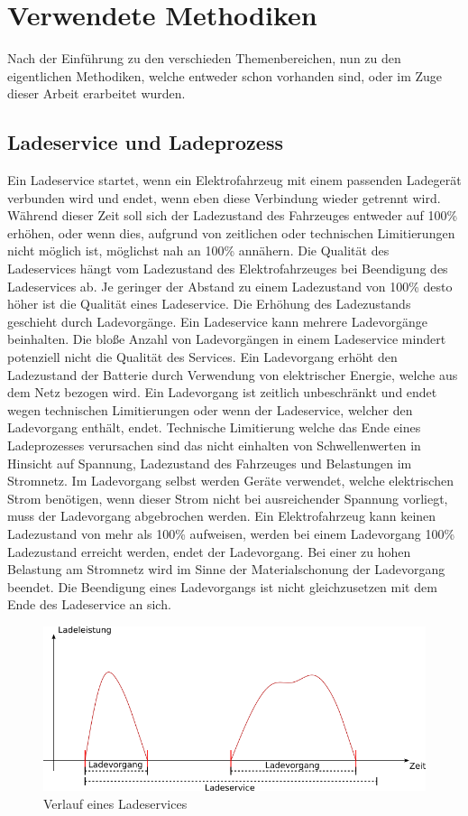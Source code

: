\chapter{Verwendete Methodiken}
Nach der Einführung zu den verschieden Themenbereichen, nun zu den eigentlichen Methodiken, welche entweder schon vorhanden sind, oder im Zuge dieser Arbeit erarbeitet wurden.
\section{Ladeservice und Ladeprozess}
Ein Ladeservice startet, wenn ein Elektrofahrzeug mit einem passenden Ladegerät verbunden wird und endet, wenn eben diese Verbindung wieder getrennt wird. Während dieser Zeit soll sich der Ladezustand des Fahrzeuges entweder auf 100\% erhöhen, oder wenn dies, aufgrund von zeitlichen oder technischen Limitierungen nicht möglich ist, möglichst nah an 100\% annähern. Die Qualität des Ladeservices hängt vom Ladezustand des Elektrofahrzeuges bei Beendigung des Ladeservices ab. Je geringer der Abstand zu einem Ladezustand von 100\% desto höher ist die Qualität eines Ladeservice. Die Erhöhung des Ladezustands geschieht durch Ladevorgänge. Ein Ladeservice kann mehrere Ladevorgänge beinhalten. Die bloße Anzahl von Ladevorgängen in einem Ladeservice mindert potenziell nicht die Qualität des Services. Ein Ladevorgang erhöht den Ladezustand der Batterie durch Verwendung von elektrischer Energie, welche aus dem Netz bezogen wird. Ein Ladevorgang ist zeitlich unbeschränkt und endet wegen technischen Limitierungen oder wenn der Ladeservice, welcher den Ladevorgang enthält, endet. Technische Limitierung welche das Ende eines Ladeprozesses verursachen sind das nicht einhalten von Schwellenwerten in Hinsicht auf Spannung, Ladezustand des Fahrzeuges und Belastungen im Stromnetz. Im Ladevorgang selbst werden Geräte verwendet, welche elektrischen Strom benötigen, wenn dieser Strom nicht bei ausreichender Spannung vorliegt, muss der Ladevorgang abgebrochen werden. Ein Elektrofahrzeug kann keinen Ladezustand von mehr als 100\% aufweisen, werden bei einem Ladevorgang 100\% Ladezustand erreicht werden, endet der Ladevorgang. Bei einer zu hohen Belastung am Stromnetz wird im Sinne der Materialschonung der Ladevorgang beendet. Die Beendigung eines Ladevorgangs ist nicht gleichzusetzen mit dem Ende des Ladeservice an sich. 
\begin{figure}[tb]
	\includegraphics[width=\linewidth]{img/Ladeservice.png}
	\caption{Verlauf eines Ladeservices}
	\label{Abb_Ladeservice}
\end{figure}

